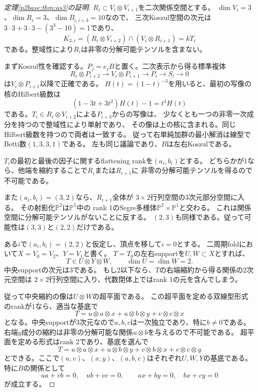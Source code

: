 \documentclass[11pt,a4paper]{ltjsarticle}
\theoremstyle{definition}
\begin{document}
\begin{proof}[定理\ref{p2base:thm:as3}の証明]
$R_i\subset V_i\otimes V_{i+1}$を二次関係空間とする。
$\dim V_i=3$、$\dim R_i=3$、$\dim B_{i,i+3}=10$なので、
三次Koszul空間の次元は$3\cdot3+3\cdot3-(3^3-10)=1$であり、
\[
K_{3,i}=(R_i\otimes V_{i+2})\cap(V_i\otimes R_{i+1})=kT_i
\]
である。整域性により$R_i$は非零の分解可能テンソルを含まない。

まずKoszul性を確認する。$P_j=e_jB$と置く。二次表示から得る標準複体
\[
R_i\otimes P_{i+2}\longrightarrow V_i\otimes P_{i+1}
\longrightarrow P_i\longrightarrow S_i\longrightarrow0
\]
は$V_i\otimes P_{i+1}$以降で正確である。
$H(t)=(1-t)^{-3}$を用いると、最初の写像の核のHilbert級数は
\[
(1-3t+3t^2)H(t)-1=t^3H(t)
\]
である。$T_i\in R_i\otimes V_{i+2}$による$P_{i+3}$からの写像は、
少なくとも一つの非零一次成分を持つので整域性により単射であり、
その像は上の核に含まれる。同じHilbert級数を持つので両者は一致する。
従って右単純加群の最小解消は線型でBetti数$(1,3,3,1)$である。
左も同じ議論であり、$B$は左右Koszulである。

$T_i$の最初と最後の因子に関するflattening rankを$(a_i,b_i)$とする。
どちらかが1なら、他端を縮約することで$R_i$または$R_{i+1}$に
非零の分解可能テンソルを得るので不可能である。

また$(a_i,b_i)=(3,2)$なら、$R_{i+1}$全体が
$3\times2$行列空間の3次元部分空間に入る。
その射影化$\mathbb P^2$は$\mathbb P^5$中の
rank 1のSegre多様体$\mathbb P^2\times\mathbb P^1$と交わる。
これは関係空間に分解可能テンソルがないことに反する。
$(2,3)$も同様である。従って可能性は$(3,3)$と$(2,2)$だけである。

ある$i$で$(a_i,b_i)=(2,2)$と仮定し、頂点を移して$i=0$とする。
二周期foldにおいて$X=V_0=V_2$、$Y=V_1$と書く。
$T=T_0$の左右supportを$U,W\subset X$とすれば、
\[
T\in U\otimes Y\otimes W,\qquad \dim U=\dim W=2.
\]
中央supportの次元は3である。
もし2以下なら、$T$の右端縮約から得る関係の2次元空間は
$2\times2$行列空間に入り、代数閉体上ではrank 1の元を含んでしまう。

従って中央縮約の像は$U\otimes W$の超平面である。
この超平面を定める双線型形式のrankが1なら、適当な基底で
\[
T=u\otimes a\otimes x+u\otimes b\otimes y+v\otimes c\otimes x
\]
となる。中央supportが3次元なので$a,b,c$は一次独立であり、特に$b\ne0$である。
右端$y$成分の縮約は非零の分解可能な関係$u\otimes b$を与えるので不可能である。
超平面を定める形式はrank 2であり、基底を選んで
\begin{equation}\label{p2base:eq:tensor-normal}
T=u\otimes a\otimes x+u\otimes b\otimes y
 +v\otimes b\otimes x+v\otimes c\otimes y
\end{equation}
とできる。ここで$(u,v)$、$(x,y)$、$(a,b,c)$はそれぞれ$U,W,Y$の基底である。
特に$B$の関係として
\begin{equation}\label{p2base:eq:four-relations}
ua+vb=0,\quad ub+vc=0,\qquad ax+by=0,\quad bx+cy=0
\end{equation}
が成立する。


\end{proof}
\end{document}
